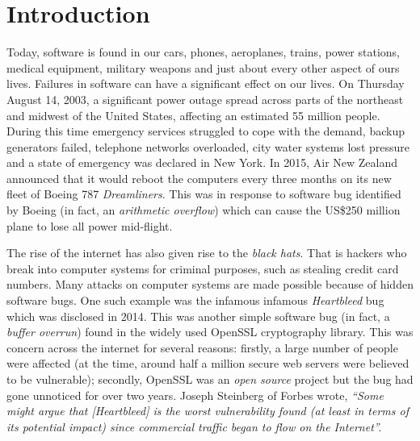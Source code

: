 \chapter{Introduction}

Today, software is found in our cars, phones, aeroplanes, trains, power stations, medical equipment, military weapons and just about every other aspect of ours lives.  Failures in software can have a significant effect on our lives.  On Thursday August 14, 2003, a significant power outage spread across parts of the northeast and midwest of the United States, affecting an estimated 55 million people.  During this time emergency services struggled to cope with the demand, backup generators failed, telephone networks overloaded, city water systems lost pressure and a state of emergency was declared in New York.  In 2015, Air New Zealand announced that it would reboot the computers every three months on its new fleet of Boeing 787 {\em Dreamliners}.  This was in response to software bug identified by Boeing (in fact, an {\em arithmetic overflow}) which can cause the US\$250 million plane to lose all power mid-flight. 

The rise of the internet has also given rise to the {\em black hats}.  That is hackers who break into computer systems for criminal purposes, such as stealing credit card numbers.  Many attacks on computer systems are made possible because of hidden software bugs.  One such example was the infamous infamous {\em Heartbleed} bug which was disclosed in 2014.  This was another simple software bug (in fact, a {\em buffer overrun}) found in the widely used OpenSSL cryptography library.   This was concern across the internet for several reasons:  firstly, a large number of people were affected (at the time, around half a million secure web servers were believed to be vulnerable); secondly, OpenSSL was an {\em open source} project but the bug had gone unnoticed for over two years. Joseph Steinberg of Forbes wrote, {\em ``Some might argue that [Heartbleed] is the worst vulnerability found (at least in terms of its potential impact) since commercial traffic began to flow on the Internet''.}




